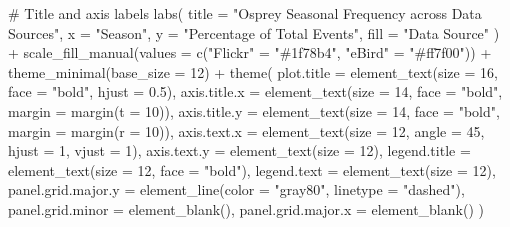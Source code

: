 \documentclass[
  letterpaper,
  DIV=11,
  numbers=noendperiod]{scrartcl}
\newenvironment{Shaded}{\begin{snugshade}}{\end{snugshade}}
\newcommand{\AttributeTok}[1]{\textcolor[rgb]{0.40,0.45,0.13}{#1}}
\newcommand{\CommentTok}[1]{\textcolor[rgb]{0.37,0.37,0.37}{#1}}
\newcommand{\DecValTok}[1]{\textcolor[rgb]{0.68,0.00,0.00}{#1}}
\newcommand{\FloatTok}[1]{\textcolor[rgb]{0.68,0.00,0.00}{#1}}
\newcommand{\FunctionTok}[1]{\textcolor[rgb]{0.28,0.35,0.67}{#1}}
\newcommand{\NormalTok}[1]{\textcolor[rgb]{0.00,0.23,0.31}{#1}}
\newcommand{\OtherTok}[1]{\textcolor[rgb]{0.00,0.23,0.31}{#1}}
\newcommand{\SpecialCharTok}[1]{\textcolor[rgb]{0.37,0.37,0.37}{#1}}
\newcommand{\StringTok}[1]{\textcolor[rgb]{0.13,0.47,0.30}{#1}}
\begin{document}
\begin{Shaded}
\begin{Highlighting}[]
  \CommentTok{\# Title and axis labels}
  \FunctionTok{labs}\NormalTok{(}
    \AttributeTok{title =} \StringTok{"Osprey Seasonal Frequency across Data Sources"}\NormalTok{,}
    \AttributeTok{x =} \StringTok{"Season"}\NormalTok{,}
    \AttributeTok{y =} \StringTok{"Percentage of Total Events"}\NormalTok{,}
    \AttributeTok{fill =} \StringTok{"Data Source"}
\NormalTok{  ) }\SpecialCharTok{+}
  \FunctionTok{scale\_fill\_manual}\NormalTok{(}\AttributeTok{values =} \FunctionTok{c}\NormalTok{(}\StringTok{"Flickr"} \OtherTok{=} \StringTok{"\#1f78b4"}\NormalTok{, }\StringTok{"eBird"} \OtherTok{=} \StringTok{"\#ff7f00"}\NormalTok{)) }\SpecialCharTok{+}
  \FunctionTok{theme\_minimal}\NormalTok{(}\AttributeTok{base\_size =} \DecValTok{12}\NormalTok{) }\SpecialCharTok{+}
  \FunctionTok{theme}\NormalTok{(}
    \AttributeTok{plot.title =} \FunctionTok{element\_text}\NormalTok{(}\AttributeTok{size =} \DecValTok{16}\NormalTok{, }\AttributeTok{face =} \StringTok{"bold"}\NormalTok{, }\AttributeTok{hjust =} \FloatTok{0.5}\NormalTok{),}
    \AttributeTok{axis.title.x =} \FunctionTok{element\_text}\NormalTok{(}\AttributeTok{size =} \DecValTok{14}\NormalTok{, }\AttributeTok{face =} \StringTok{"bold"}\NormalTok{, }\AttributeTok{margin =} \FunctionTok{margin}\NormalTok{(}\AttributeTok{t =} \DecValTok{10}\NormalTok{)),}
    \AttributeTok{axis.title.y =} \FunctionTok{element\_text}\NormalTok{(}\AttributeTok{size =} \DecValTok{14}\NormalTok{, }\AttributeTok{face =} \StringTok{"bold"}\NormalTok{, }\AttributeTok{margin =} \FunctionTok{margin}\NormalTok{(}\AttributeTok{r =} \DecValTok{10}\NormalTok{)),}
    \AttributeTok{axis.text.x =} \FunctionTok{element\_text}\NormalTok{(}\AttributeTok{size =} \DecValTok{12}\NormalTok{, }\AttributeTok{angle =} \DecValTok{45}\NormalTok{, }\AttributeTok{hjust =} \DecValTok{1}\NormalTok{, }\AttributeTok{vjust =} \DecValTok{1}\NormalTok{),}
    \AttributeTok{axis.text.y =} \FunctionTok{element\_text}\NormalTok{(}\AttributeTok{size =} \DecValTok{12}\NormalTok{),}
    \AttributeTok{legend.title =} \FunctionTok{element\_text}\NormalTok{(}\AttributeTok{size =} \DecValTok{12}\NormalTok{, }\AttributeTok{face =} \StringTok{"bold"}\NormalTok{),}
    \AttributeTok{legend.text =} \FunctionTok{element\_text}\NormalTok{(}\AttributeTok{size =} \DecValTok{12}\NormalTok{),}
    \AttributeTok{panel.grid.major.y =} \FunctionTok{element\_line}\NormalTok{(}\AttributeTok{color =} \StringTok{"gray80"}\NormalTok{, }\AttributeTok{linetype =} \StringTok{"dashed"}\NormalTok{),}
    \AttributeTok{panel.grid.minor =} \FunctionTok{element\_blank}\NormalTok{(),}
    \AttributeTok{panel.grid.major.x =} \FunctionTok{element\_blank}\NormalTok{()}
\NormalTok{  )}
\end{Highlighting}
\end{Shaded}
\end{document}
